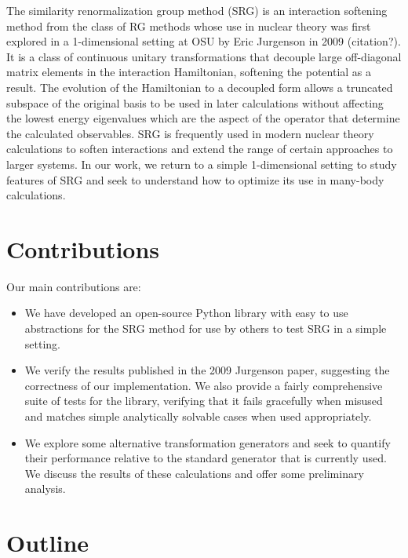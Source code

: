 The similarity renormalization group method (SRG) is an interaction softening method from the class of RG methods whose use in nuclear theory was first explored in a 1-dimensional setting at OSU by Eric Jurgenson in 2009 (citation?). It is a class of continuous unitary transformations that decouple large off-diagonal matrix elements in the interaction Hamiltonian, softening the potential as a result. The evolution of the Hamiltonian to a decoupled form allows a truncated subspace of the original basis to be used in later calculations without affecting the lowest energy eigenvalues which are the aspect of the operator that determine the calculated observables. SRG is frequently used in modern nuclear theory calculations to soften interactions and extend the range of certain approaches to larger systems. In our work, we return to a simple 1-dimensional setting to study features of SRG and seek to understand how to optimize its use in many-body calculations.

\section{Contributions}

Our main contributions are:
\begin{itemize}
    \item{We have developed an open-source Python library with easy to use abstractions for the SRG method for use by others to test SRG in a simple setting.}
    \item{We verify the results published in the 2009 Jurgenson paper, suggesting the correctness of our implementation. We also provide a fairly comprehensive suite of tests for the library, verifying that it fails gracefully when misused and matches simple analytically solvable cases when used appropriately.}
    \item{We explore some alternative transformation generators and seek to quantify their performance relative to the standard generator that is currently used. We discuss the results of these calculations and offer some preliminary analysis.}
\end{itemize}

\section{Outline}


